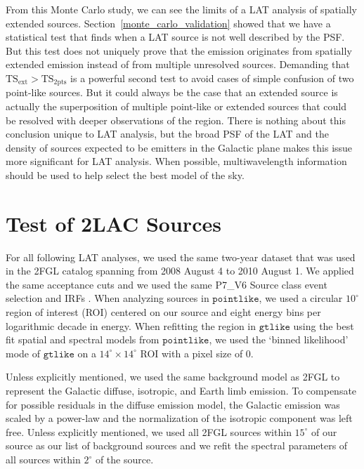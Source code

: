 \documentclass[12pt,preprint]{aastex}
\newcommand{\gev}{\text{GeV}\xspace}
\newcommand{\tsext}{{\ensuremath{\text{TS}_{\text{ext}}}}\xspace}
\newcommand{\tsinc}{\ensuremath{\text{TS}_{\text{2pts}}}\xspace}
\newcommand{\gtlike}{\ensuremath{\mathtt{gtlike}}\xspace}
\newcommand{\pointlike}{\ensuremath{\mathtt{pointlike}}\xspace}
\newcommand{\degree}{^\circ\xspace}
\begin{document}
From this Monte Carlo study, we can see the limits of a LAT analysis
of spatially extended sources.  Section~\ref{monte_carlo_validation}
showed that we have a statistical test that finds when a LAT source is
not well described by the PSF.  But this test does not uniquely prove
that the emission originates from spatially extended emission instead
of from multiple unresolved sources.  Demanding that $\tsext>\tsinc$
is a powerful second test to avoid cases of simple confusion of two
point-like sources. But it could always be the case that an extended
source is actually the superposition of multiple point-like or
extended sources that could be resolved with deeper observations of the
region.  There is nothing about this conclusion unique to LAT analysis,
but the broad PSF of the LAT and the density of sources expected to be
\gev emitters in the Galactic plane makes this issue more significant
for LAT analysis.  When possible, multiwavelength information should be
used to help select the best model of the sky.


\section{Test of 2LAC Sources}
\label{test_2lac_sources}


For all following LAT analyses, we used the same two-year dataset
that was used in the 2FGL catalog spanning from 2008 August 4 to 2010 August 1. We
applied the same acceptance cuts and we used the same P7\_V6 Source class
event selection and IRFs \citep{lat_on_orbit_psf}.  
When analyzing sources in \pointlike, we used a circular $10\degree$ region of
interest (ROI) centered on our source and eight energy bins per
logarithmic decade in energy.
When refitting the region in \gtlike using the best fit spatial and
spectral models from \pointlike, we used the `binned likelihood' mode of
\gtlike on a $14\degree\times14\degree$ ROI with a pixel size of 0.

Unless explicitly
mentioned, we used the same background model as 2FGL to represent the
Galactic diffuse, isotropic, and Earth limb emission.  To compensate for
possible residuals in the diffuse emission model, the Galactic emission
was scaled by a power-law and the normalization
of the isotropic component
was left free.  
Unless explicitly mentioned,
we used all 2FGL sources within $15\degree$ of our source as our list
of background sources and we refit the spectral parameters of all sources
within $2\degree$ of the source.
\end{document}
